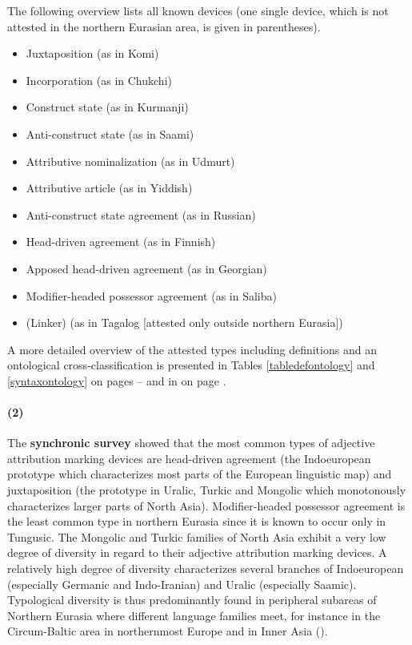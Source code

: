 The following overview lists all known devices (one single device, which is not attested in the northern Eurasian area, is given in parentheses).
\begin{itemize}
\item{Juxtaposition} (as in Komi)
\item{Incorporation} (as in Chukchi)
\item{Construct state} (as in Kurmanji)
\item{Anti-construct state} (as in Saami)
\item{Attributive nominalization} (as in Udmurt)
\item{Attributive article} (as in Yiddish)
\item{Anti-construct state agreement} (as in Russian)
\item{Head-driven agreement} (as in Finnish)
\item{Apposed head-driven agreement} (as in Georgian)
\item{Modifier-headed possessor agreement} (as in Saliba)
\item{(Linker)} (as in Tagalog [attested only outside northern Eurasia])
\end{itemize}
A more detailed overview of the attested types including definitions and an ontological cross-classification is presented in Tables \ref{tabledefontology} and \ref{syntaxontology} on pages \pageref{tabledefontology}–\pageref{syntaxontology} and in  on page \pageref{tree ontology}.

\paragraph{(2)} The {\bf synchronic survey} showed that the most common types of adjective attribution marking devices are head-driven agreement (the Indoeuropean prototype which characterizes most parts of the European linguistic map) and juxtaposition (the prototype in Uralic, Turkic and Mongolic which monotonously characterizes larger parts of North Asia). Modifier-headed possessor agreement is the least common type in northern Eurasia since it is known to occur only in Tungusic. The Mongolic and Turkic families of North Asia exhibit a very low degree of diversity in regard to their adjective attribution marking devices. A relatively high degree of diversity characterizes several branches of Indoeuropean (especially Germanic and Indo-Iranian) and Uralic (especially Saamic). Typological diversity is thus predominantly found in peripheral subareas of Northern Eurasia where different language families meet, for instance in the Circum-Baltic area in northernmost Europe and in Inner Asia ().

